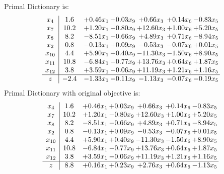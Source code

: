 \documentclass[8pt]{article}
\begin{document}
Primal Dictionary is:
\[\begin{array}{c| c c@{\hskip 2pt} c@{\hskip 2pt} c@{\hskip 2pt} c@{\hskip 2pt} c@{\hskip 2pt} }
 x_{4}   &  1.6 & +  0.46 x_{1} & +  0.03 x_{9} & +  0.66 x_{3} & +  0.14 x_{6} & -0.83 x_{5}\\
 x_{7}   &  10.2 & +  1.20 x_{1} & -0.80 x_{9} & + 12.60 x_{3} & +  1.00 x_{6} & +  5.20 x_{5}\\
 x_{8}   &  8.2 & -8.51 x_{1} & -0.66 x_{9} & +  4.89 x_{3} & +  0.71 x_{6} & -8.94 x_{5}\\
 x_{2}   &  0.8 & -0.13 x_{1} & +  0.09 x_{9} & -0.53 x_{3} & -0.07 x_{6} & +  0.01 x_{5}\\
 x_{10}   &  4.4 & +  5.90 x_{1} & +  0.40 x_{9} & -11.30 x_{3} & -1.50 x_{6} & +  8.90 x_{5}\\
 x_{11}   &  10.8 & -6.84 x_{1} & -0.77 x_{9} & + 13.76 x_{3} & +  0.64 x_{6} & +  1.87 x_{5}\\
 x_{12}   &  3.8 & +  3.59 x_{1} & -0.06 x_{9} & + 11.19 x_{3} & +  1.21 x_{6} & +  1.16 x_{5}\\
\hline
z    &  -2.4 & -1.33 x_{1} & -0.11 x_{9} & -1.13 x_{3} & -0.07 x_{6} & -0.19 x_{5}\\
\end{array}\]
Primal Dictionary with original objective is:
\[\begin{array}{c| c c@{\hskip 2pt} c@{\hskip 2pt} c@{\hskip 2pt} c@{\hskip 2pt} c@{\hskip 2pt} }
 x_{4}   &  1.6 & +  0.46 x_{1} & +  0.03 x_{9} & +  0.66 x_{3} & +  0.14 x_{6} & -0.83 x_{5}\\
 x_{7}   &  10.2 & +  1.20 x_{1} & -0.80 x_{9} & + 12.60 x_{3} & +  1.00 x_{6} & +  5.20 x_{5}\\
 x_{8}   &  8.2 & -8.51 x_{1} & -0.66 x_{9} & +  4.89 x_{3} & +  0.71 x_{6} & -8.94 x_{5}\\
 x_{2}   &  0.8 & -0.13 x_{1} & +  0.09 x_{9} & -0.53 x_{3} & -0.07 x_{6} & +  0.01 x_{5}\\
 x_{10}   &  4.4 & +  5.90 x_{1} & +  0.40 x_{9} & -11.30 x_{3} & -1.50 x_{6} & +  8.90 x_{5}\\
 x_{11}   &  10.8 & -6.84 x_{1} & -0.77 x_{9} & + 13.76 x_{3} & +  0.64 x_{6} & +  1.87 x_{5}\\
 x_{12}   &  3.8 & +  3.59 x_{1} & -0.06 x_{9} & + 11.19 x_{3} & +  1.21 x_{6} & +  1.16 x_{5}\\
\hline
z    &  8.8 & +  0.16 x_{1} & +  0.23 x_{9} & +  2.76 x_{3} & +  0.64 x_{6} & -1.13 x_{5}\\
\end{array}\]
\end{document}
